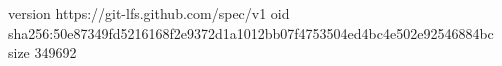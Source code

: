 version https://git-lfs.github.com/spec/v1
oid sha256:50e87349fd5216168f2e9372d1a1012bb07f4753504ed4bc4e502e92546884bc
size 349692
